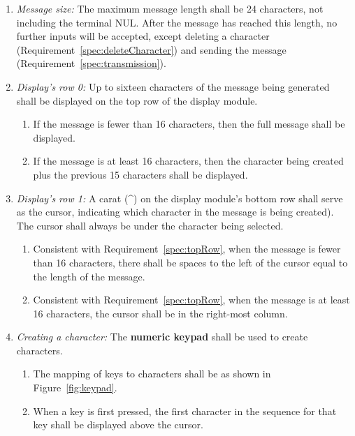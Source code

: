 \begin{enumerate}
    \item \textit{Message size:} \label{spec:messageLength} The maximum message length shall be 24 characters, not including the terminal NUL\@.
        After the message has reached this length, no further inputs will be accepted, except deleting a character (Requirement~\ref{spec:deleteCharacter}) and sending the message (Requirement~\ref{spec:transmission}).
    \item \textit{Display's row 0:} \label{spec:topRow} Up to sixteen characters of the message being generated shall be displayed on the top row of the display module.
        \begin{enumerate}
            \item If the message is fewer than 16 characters, then the full message shall be displayed.
            \item If the message is at least 16 characters, then the character being created plus the previous 15 characters shall be displayed.
        \end{enumerate}
    \item \textit{Display's row 1:} \label{spec:bottomRow} A carat (\^{}) on the display module's bottom row shall serve as the cursor, indicating which character in the message is being created).
        The cursor shall always be under the character being selected.
        \begin{enumerate}
            \item Consistent with Requirement~\ref{spec:topRow}, when the message is fewer than 16 characters, there shall be spaces to the left of the cursor equal to the length of the message.
            \item Consistent with Requirement~\ref{spec:topRow}, when the message is at least 16 characters, the cursor shall be in the right-most column.
        \end{enumerate}
    \item \textit{Creating a character:}  \label{spec:createCharacter} The \textbf{numeric keypad} shall be used to create characters.
        \begin{enumerate}
            \item \label{spec:keypad} The mapping of keys to characters shall be as shown in Figure~\ref{fig:keypad}.
            \item \label{spec:firstPress} When a key is first pressed, the first character in the sequence for that key shall be displayed above the cursor.

\end{enumerate}
\end{enumerate}
